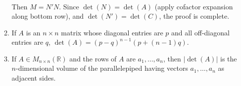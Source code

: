 \documentclass[10pt]{article}
\begin{document}
\begin{multicols*}{2}
\begin{enumerate}
\begin{enumerate}
\begin{align*}
        \end{align*}
        Then $M=N'N$. Since $\det(N)=\det(A)$ (apply cofactor expansion along bottom row), and $\det(N')=\det(C)$, the proof is complete.
        \item If $A$ is an $n \times n$ matrix whose diagonal entries are $p$ and all off-diagonal entries are $q$, $\det(A) = (p-q)^{n-1}(p+(n-1)q)$.
        \item If $A \in M_{n \times n}(\mathbb{R})$ and the rows of $A$ are $a_1, \hdots, a_n$, then $| \det(A) |$ is the $n$-dimensional volume of the parallelepiped having vectors $a_1, \hdots, a_n$ as adjacent sides.
    \end{enumerate}
    

\end{enumerate}
\end{multicols*}
\end{document}
